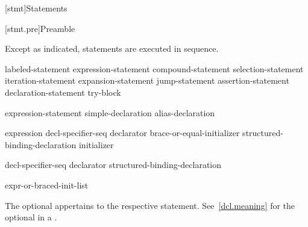 [stmt]{Statements}%



[stmt.pre]{Preamble}

\pnum
Except as indicated, statements are executed in sequence.

\begin{bnf}
\br
    labeled-statement\br
     expression-statement\br
     compound-statement\br
     selection-statement\br
     iteration-statement\br
     expansion-statement\br
     jump-statement\br
     assertion-statement\br
    declaration-statement\br
     try-block
\end{bnf}

\begin{bnf}
\br
    expression-statement\br
    simple-declaration\br
    alias-declaration
\end{bnf}

\begin{bnf}
\br
    expression\br
     decl-specifier-seq declarator brace-or-equal-initializer\br
    structured-binding-declaration initializer
\end{bnf}

\begin{bnf}
\br
     decl-specifier-seq declarator\br
    structured-binding-declaration
\end{bnf}

\begin{bnf}
\br
    expr-or-braced-init-list
\end{bnf}

The optional  appertains to the respective statement.
See~\ref{dcl.meaning} for the optional  in a
.

